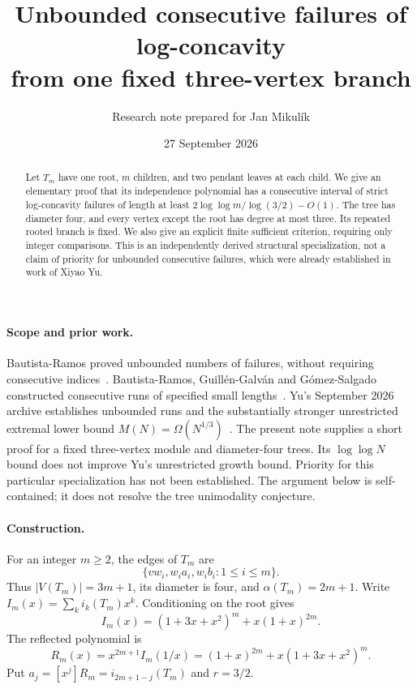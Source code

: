\documentclass[11pt]{article}
\title{Unbounded consecutive failures of log-concavity\\from one fixed three-vertex branch}
\author{Research note prepared for Jan Mikul\'ik}
\date{27 September 2026}
\newcommand{\coef}[2]{[x^{#1}]#2}
\begin{document}
\maketitle
\begin{abstract}
Let $T_m$ have one root, $m$ children, and two pendant leaves at each child. We give an elementary proof that its independence polynomial has a consecutive interval of strict log-concavity failures of length at least
$2\log\log m/\log(3/2)-O(1)$.
The tree has diameter four, and every vertex except the root has degree at most three. Its repeated rooted branch is fixed. We also give an explicit finite sufficient criterion, requiring only integer comparisons. This is an independently derived structural specialization, not a claim of priority for unbounded consecutive failures, which were already established in work of Xiyao Yu.
\end{abstract}

\paragraph{Scope and prior work.}
Bautista-Ramos proved unbounded numbers of failures, without requiring consecutive indices~\cite{BR25}. Bautista-Ramos, Guill\'en-Galv\'an and G\'omez-Salgado constructed consecutive runs of specified small lengths~\cite{BR26}. Yu's September 2026 archive establishes unbounded runs and the substantially stronger unrestricted extremal lower bound $M(N)=\Omega(N^{1/3})$~\cite{Yu26}. The present note supplies a short proof for a fixed three-vertex module and diameter-four trees. Its $\log\log N$ bound does not improve Yu's unrestricted growth bound. Priority for this particular specialization has not been established. The argument below is self-contained; it does not resolve the tree unimodality conjecture.

\paragraph{Construction.}
For an integer $m\ge2$, the edges of $T_m$ are
\[
 \{vw_i,w_ia_i,w_ib_i:1\le i\le m\}.
\]
Thus $|V(T_m)|=3m+1$, its diameter is four, and $\alpha(T_m)=2m+1$.
Write $I_m(x)=\sum_k i_k(T_m)x^k$. Conditioning on the root gives
\begin{equation}\label{eq:I}
 I_m(x)=(1+3x+x^2)^m+x(1+x)^{2m}.
\end{equation}
The reflected polynomial is
\begin{equation}\label{eq:R}
 R_m(x)=x^{2m+1}I_m(1/x)=(1+x)^{2m}+x(1+3x+x^2)^m.
\end{equation}
Put $a_j=\coef{j}{R_m}=i_{2m+1-j}(T_m)$ and $r=3/2$.
\end{document}
